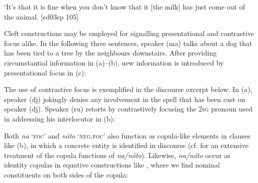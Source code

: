 \glt ‘It’s that it is fine when you don’t know that it [the milk] has just come out of the 
animal. [ed03sp 105]
\z

Cleft constructions may be employed for signalling presentational and contrastive focus alike. In the following three sentences, speaker (ma) talks about a dog that has been tied to a tree by the neighbours downstairs. After providing circumstantial information in (a)–(b), new information is introduced by presentational focus in (c): 


\ea%
    \label{ex:key:693}
\z\z

The use of contrastive focus is exemplified in the discourse excerpt below. In (a), speaker (dj) jokingly denies any involvement in the spell that has been cast on speaker (dj). Speaker (ru) retorts by contrastively focusing the \textsc{2sg} pronoun used in addressing his interlocutor in (b): 


\ea%
    \label{ex:key:694}
\z\z

Both \textit{na} ‘\textsc{foc}’ and \textit{nóto} ‘\textsc{neg}.\textsc{foc}’ also function as copula-like elements in clauses like (b), in which a concrete entity is identified in discourse (cf.  for an extensive treatment of the copula functions of \textit{na}\textit{\textup{/}}\textit{nóto}). Likewise, \textit{na}\textit{\textup{/}}\textit{nóto} occur as identity copulas in equative constructions like , where we find nominal constituents on both sides of the copula: 


